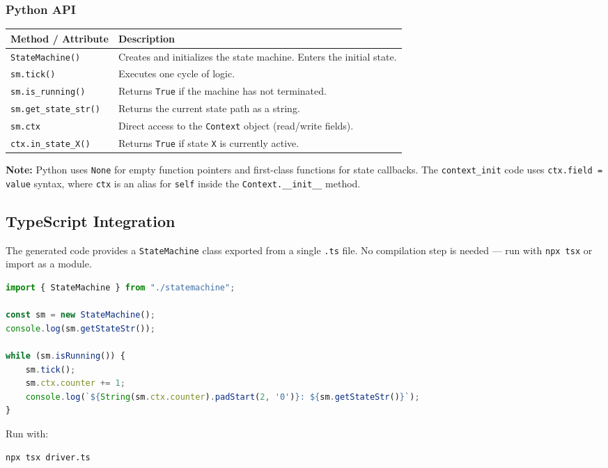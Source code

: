 \documentclass[a4paper,11pt]{article}
\begin{document}
\subsubsection*{Python API}
\begin{longtable}{@{}lp{10cm}@{}}
\toprule
\textbf{Method / Attribute} & \textbf{Description} \\
\midrule
\endhead
\texttt{StateMachine()} & Creates and initializes the state machine. Enters the initial state. \\
\texttt{sm.tick()} & Executes one cycle of logic. \\
\texttt{sm.is\_running()} & Returns \texttt{True} if the machine has not terminated. \\
\texttt{sm.get\_state\_str()} & Returns the current state path as a string. \\
\texttt{sm.ctx} & Direct access to the \texttt{Context} object (read/write fields). \\
\texttt{ctx.in\_state\_X()} & Returns \texttt{True} if state \texttt{X} is currently active. \\
\bottomrule
\end{longtable}

\textbf{Note:} Python uses \texttt{None} for empty function pointers and first-class functions for state callbacks. The \texttt{context\_init} code uses \texttt{ctx.field = value} syntax, where \texttt{ctx} is an alias for \texttt{self} inside the \texttt{Context.\_\_init\_\_} method.

\subsection{TypeScript Integration}
The generated code provides a \texttt{StateMachine} class exported from a single \texttt{.ts} file. No compilation step is needed --- run with \texttt{npx tsx} or import as a module.

\begin{lstlisting}[language=TypeScript, caption={Example TypeScript driver}]
import { StateMachine } from "./statemachine";

const sm = new StateMachine();
console.log(sm.getStateStr());

while (sm.isRunning()) {
    sm.tick();
    sm.ctx.counter += 1;
    console.log(`${String(sm.ctx.counter).padStart(2, '0')}: ${sm.getStateStr()}`);
}
\end{lstlisting}

Run with:
\begin{lstlisting}[language=Bash]
npx tsx driver.ts
\end{lstlisting}
\end{document}
